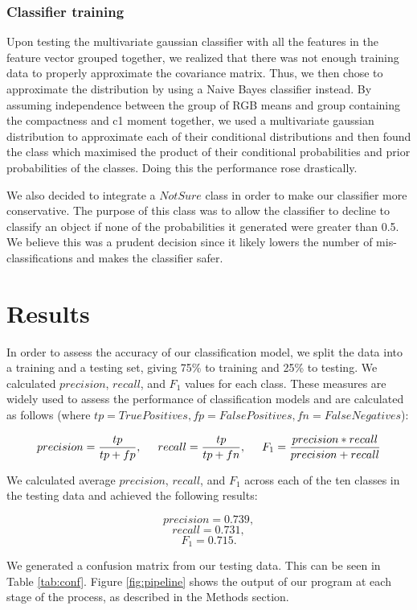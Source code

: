 \documentclass[12pt]{article}
\begin{document}
\subsubsection{Classifier training}

Upon testing the multivariate gaussian classifier with all the features in the feature vector grouped together, we realized that there was not enough training data to properly approximate the covariance matrix. Thus, we then chose to approximate the distribution by using a Naive Bayes classifier instead. By assuming independence between the group of RGB means and group containing the compactness and c1 moment together, we used a multivariate gaussian distribution to approximate each of their conditional distributions and then found the class which maximised the product of their conditional probabilities and prior probabilities of the classes. Doing this the performance rose drastically.

We also decided to integrate a $NotSure$ class in order to make our classifier more conservative. The purpose of this class was to allow the classifier to decline to classify an object if none of the probabilities it generated were greater than 0.5. We believe this was a prudent decision since it likely lowers the number of mis-classifications and makes the classifier safer.

\section{Results}

In order to assess the accuracy of our classification model, we split the data into a training and a testing set, giving 75\% to training and 25\% to testing. We calculated $precision$, $recall$, and $F_1$ values for each class. These measures are widely used to assess the performance of classification models and are calculated as follows (where $tp=TruePositives,fp=FalsePositives,fn=FalseNegatives$):

\[precision=\frac{tp}{tp+fp},\hspace{5mm}recall=\frac{tp}{tp+fn},\hspace{5mm}F_1=\frac{precision*recall}{precision+recall}\]

We calculated average $precision$, $recall$, and $F_1$ across each of the ten classes in the testing data and achieved the following results: 

\[precision=0.739,\]
\[recall=0.731,\]
\[F_1=0.715.\]

We generated a confusion matrix from our testing data. This can be seen in Table \ref{tab:conf}. Figure \ref{fig:pipeline} shows the output of our program at each stage of the process, as described in the Methods section.
\end{document}
